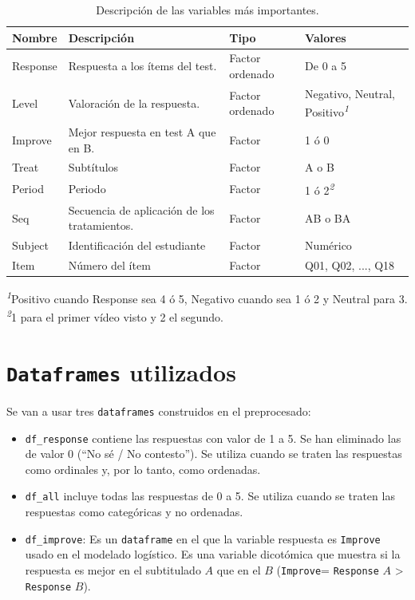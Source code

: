 \documentclass[
  12pt,
  a4paper,
  extrafontsizes,
  onecolumn,
  openright,
  table]{memoir}
\providecommand{\tightlist}{%
  \setlength{\itemsep}{0pt}\setlength{\parskip}{0pt}}\usepackage{longtable,booktabs,array}
\begin{document}
\footnotesize

\hypertarget{tbl-variables}{}
\setlength{\LTpost}{0mm}
\begin{longtable}{llll}
\caption{\label{tbl-variables}Descripción de las variables más importantes. }\tabularnewline

\toprule
Nombre & Descripción & Tipo & Valores \\ 
\midrule
Response & Respuesta a los ítems del test. & Factor ordenado & De 0 a 5 \\ 
Level & Valoración de la respuesta. & Factor ordenado & Negativo, Neutral, Positivo\textsuperscript{\textit{1}} \\ 
Improve & Mejor respuesta en test A que en B. & Factor & 1 ó 0 \\ 
Treat & Subtítulos & Factor & A o B \\ 
Period & Periodo & Factor & 1 ó 2\textsuperscript{\textit{2}} \\ 
Seq & Secuencia de aplicación de los tratamientos. & Factor & AB o BA \\ 
Subject & Identificación del estudiante & Factor & Numérico \\ 
Item & Número del ítem & Factor & Q01, Q02, ..., Q18 \\ 
\bottomrule
\end{longtable}
\begin{minipage}{\linewidth}
\textsuperscript{\textit{1}}Positivo cuando Response sea 4 ó 5, Negativo cuando sea 1 ó 2 y Neutral para 3.\\
\textsuperscript{\textit{2}}1 para el primer vídeo visto y 2 el segundo.\\
\end{minipage}

\normalsize

\hypertarget{dataframes-utilizados}{%
\section{\texorpdfstring{\texttt{Dataframes}
utilizados}{Dataframes utilizados}}\label{dataframes-utilizados}}

Se van a usar tres \texttt{dataframes} construidos en el preprocesado:

\begin{itemize}
\tightlist
\item
  \texttt{df\_response} contiene las respuestas con valor de 1 a 5. Se
  han eliminado las de valor 0 (\enquote{No sé / No contesto}). Se
  utiliza cuando se traten las respuestas como ordinales y, por lo
  tanto, como ordenadas.
\item
  \texttt{df\_all} incluye todas las respuestas de 0 a 5. Se utiliza
  cuando se traten las respuestas como categóricas y no ordenadas.
\item
  \texttt{df\_improve}: Es un \texttt{dataframe} en el que la variable
  respuesta es \texttt{Improve} usado en el modelado logístico. Es una
  variable dicotómica que muestra si la respuesta es mejor en el
  subtitulado \(A\) que en el \(B\) (\texttt{Improve}= \texttt{Response}
  \(A\) \textgreater{} \texttt{Response} \(B\)).
\end{itemize}
\end{document}
